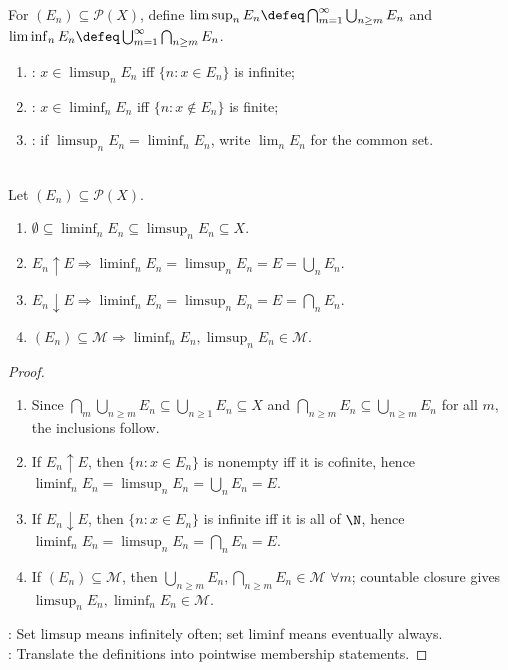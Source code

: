 \begin{definition} \label{def:set-liminf-limsup} \\
For $(E_n)\subseteq\mathcal{P}(X)$, define $\limsup_nE_n\defeq\bigcap_{m=1}^{\infty}\bigcup_{n\geq m}E_n$ and $\liminf_nE_n\defeq\bigcup_{m=1}^{\infty}\bigcap_{n\geq m}E_n$.
\begin{enumerate}[label=(\roman*)]
\setlength{\itemsep}{0pt}
\item {}: $x\in\limsup_nE_n$ iff $\{n:x\in E_n\}$ is infinite;
\item {}: $x\in\liminf_nE_n$ iff $\{n:x\notin E_n\}$ is finite;
\item {}: if $\limsup_nE_n=\liminf_nE_n$, write $\lim_nE_n$ for the common set.
\end{enumerate}
\end{definition}

\begin{proposition} \label{prop:set-limits-basic-laws} \\
Let $(E_n)\subseteq\mathcal{P}(X)$.
\begin{enumerate}[label=(\roman*)]
\setlength{\itemsep}{0pt}
\item $\emptyset\subseteq\liminf_nE_n\subseteq\limsup_nE_n\subseteq X$.
\item $E_n\uparrow E\Longrightarrow\liminf_nE_n=\limsup_nE_n=E=\bigcup_nE_n$.
\item $E_n\downarrow E\Longrightarrow\liminf_nE_n=\limsup_nE_n=E=\bigcap_nE_n$.
\item $(E_n)\subseteq\mathcal{M}\Longrightarrow\liminf_nE_n,\limsup_nE_n\in\mathcal{M}$.
\end{enumerate}
\begin{proof}
\begin{enumerate}[label=(\roman*)]
\setlength{\itemsep}{0pt}
\item Since $\bigcap_m\bigcup_{n\geq m}E_n\subseteq\bigcup_{n\geq1}E_n\subseteq X$ and $\bigcap_{n\geq m}E_n\subseteq\bigcup_{n\geq m}E_n$ for all $m$, the inclusions follow.
\item If $E_n\uparrow E$, then $\{n:x\in E_n\}$ is nonempty iff it is cofinite, hence $\liminf_nE_n=\limsup_nE_n=\bigcup_nE_n=E$.
\item If $E_n\downarrow E$, then $\{n:x\in E_n\}$ is infinite iff it is all of $\N$, hence $\liminf_nE_n=\limsup_nE_n=\bigcap_nE_n=E$.
\item If $(E_n)\subseteq\mathcal{M}$, then $\bigcup_{n\geq m}E_n,\bigcap_{n\geq m}E_n\in\mathcal{M}$ $\forall m$; countable closure gives $\limsup_nE_n,\liminf_nE_n\in\mathcal{M}$.
\end{enumerate}
: Set limsup means infinitely often; set liminf means eventually always.\\
: Translate the definitions into pointwise membership statements.
\end{proof}
\end{proposition}

